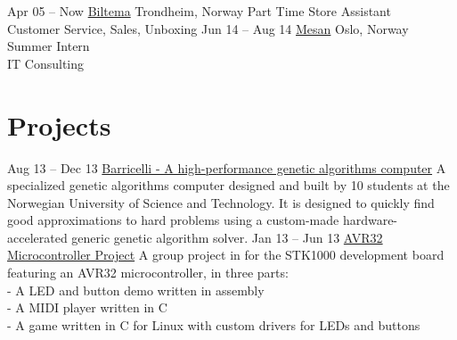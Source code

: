 \documentclass[print]{friggeri-cv}
\begin{document}
\begin{entrylist}
    \entry
        {Apr 05 – Now}
        {\href{http://biltema.no/}{Biltema}}
        {Trondheim, Norway}
        {Part Time Store Assistant\\
        Customer Service, Sales, Unboxing}
    \entry
        {Jun 14 – Aug 14}
        {\href{http://mesan.no/}{Mesan}}
        {Oslo, Norway}
        {Summer Intern\\
        IT Consulting}
\end{entrylist}

\section{Projects}

\begin{entrylist}
    \entry
        {Aug 13 – Dec 13}
        {\href{http://barricel.li/}{Barricelli - A high-performance genetic algorithms computer}}
        {}
        {A specialized genetic algorithms computer designed and built by 10 students at the Norwegian University of Science and Technology. It is designed to quickly find good approximations to hard problems using a custom-made hardware-accelerated generic genetic algorithm solver.}
    \entry
        {Jan 13 – Jun 13}
        {\href{https://github.com/lundal/avr32-project-2013}{AVR32 Microcontroller Project}}
        {}
        {A group project in for the STK1000 development board featuring an AVR32 microcontroller, in three parts:\\
        - A LED and button demo written in assembly\\
        - A MIDI player written in C\\
        - A game written in C for Linux with custom drivers for LEDs and buttons}
\end{entrylist}
\end{document}
